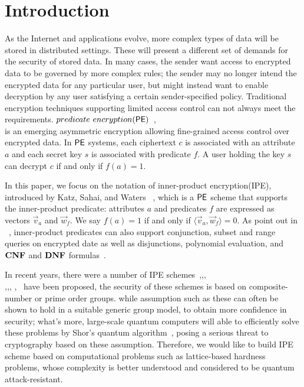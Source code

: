 \section{Introduction}
As the Internet and applications evolve, more complex types of data will be stored in distributed settings. These will present a different set of demands for the security of stored data. In many cases, the sender want access to encrypted data to be governed by more complex rules; the sender may no longer intend the encrypted data for any particular user, but might instead want to enable decryption by any user satisfying a certain sender-specified policy. Traditional encryption techniques supporting limited access control can not always meet the requirements. $predicate\ encryption(\PE) $~\cite{TCC:BonWat07},\\ \cite{EC:KatSahWat08} is an emerging asymmetric encryption allowing fine-grained access control over encrypted data. In $\mathsf{PE}$ systems, each ciphertext $c$ is associated with an attribute $a$ and each secret key $s$ is associated with predicate $f$. A user holding the key $s$ can decrypt $c$ if and only if $f(a)=1$.\

In this paper, we focus on the notation of inner-product encryption(IPE), introduced by Katz, Sahai, and Waters ~\cite{EC:KatSahWat08}, which is a $\mathsf{PE}$ scheme that supports the inner-product predicate: attributes $a$ and predicates $f$ are expressed as vectors $\overrightarrow{v}_{a}$ and $\overrightarrow{w}_{f}$. We say $f(a)=1$ if and only if $\langle \overrightarrow{v}_{a}, \overrightarrow{w}_{f} \rangle=0$. As point out in  ~\cite{EC:KatSahWat08}, inner-product predicates can also support conjunction, subset and range queries on encrypted date\cite{TCC:BonWat07} as well as disjunctions, polynomial evaluation, and $\mathbf{CNF}$ and $\mathbf{DNF}$ formulas~\cite{EC:KatSahWat08}.\

In recent years, there were a number of IPE schemes~\cite{EC:KatSahWat08},\cite{AC:OkaTak09},\cite{EC:LOSTW10},\\ \cite{C:OkaTak10},\cite{PKC:AttLib10},\cite{Park2011Inner}, \cite{CANS:OkaTak11},~\cite{EC:OkaTak12} have been proposed, the security of these schemes is based on composite-number or prime order groups. while assumption such as these can often be shown to hold in a suitable generic group model, to obtain more confidence in security; what's more, large-scale quantum computers will able to efficiently solve these problems by Shor's quantum algorithm~\cite{FOCS:Shor94}, posing a serious threat to cryptography based on these assumption. Therefore, we would like to build IPE scheme based on computational problems such as lattice-based hardness problems, whose complexity is better understood and considered to be quantum attack-resistant.\

